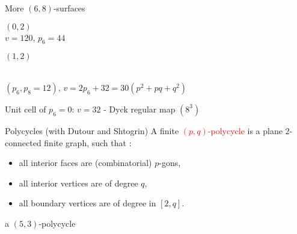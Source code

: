 \documentclass[%
pdf,
colorBG,
slideColor,
]{prosper}
\begin{document}
\begin{slide}{More $(6,8)$-surfaces}
\begin{center}
\begin{minipage}[b]{5.5cm}
\centering
{}\par
$(0,2)$\\
$v=120$, $p_6=44$
\end{minipage}
\begin{minipage}[b]{5.5cm}
\centering
{}\par
$(1,2)$\\
\textcolor{white}{Bonjour}
\end{minipage}
\end{center}

\begin{center}
$(p_6, p_8=12)$, $v=2p_6+32=30(p^2+pq+q^2)$\par
Unit cell of $p_6=0$: $v=32$ - Dyck regular map $(8^3)$
\end{center}

\end{slide}


\begin{slide}{Polycycles (with Dutour and Shtogrin)}
A finite \textcolor{red}{$(p,q)$-polycycle}  is a plane $2$-connected finite graph, such that :

\begin{itemize}
\item all interior faces are (combinatorial) $p$-gons,
\item all interior vertices are of degree $q$,
\item all boundary vertices are of degree in $[2,q]$.
\end{itemize}

\begin{center}
\par
a $(5,3)$-polycycle
\end{center}

\end{slide}
\end{document}
